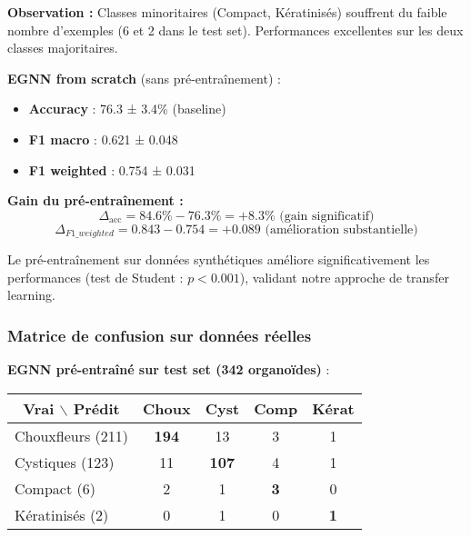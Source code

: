 \textbf{Observation :} Classes minoritaires (Compact, Kératinisés) souffrent du faible nombre d'exemples (6 et 2 dans le test set). Performances excellentes sur les deux classes majoritaires.

\textbf{EGNN from scratch} (sans pré-entraînement) :
\begin{itemize}
    \item \textbf{Accuracy} : 76.3 ± 3.4\% (baseline)
    \item \textbf{F1 macro} : 0.621 ± 0.048
    \item \textbf{F1 weighted} : 0.754 ± 0.031
\end{itemize}

\textbf{Gain du pré-entraînement :}
\[
\Delta_{\text{acc}} = 84.6\% - 76.3\% = +8.3\% \text{ (gain significatif)}
\]
\[
\Delta_{F1\_weighted} = 0.843 - 0.754 = +0.089 \text{ (amélioration substantielle)}
\]

Le pré-entraînement sur données synthétiques améliore significativement les performances (test de Student : $p < 0.001$), validant notre approche de transfer learning.

\subsubsection{Matrice de confusion sur données réelles}

\textbf{EGNN pré-entraîné sur test set (342 organoïdes)} :

\begin{center}
\begin{tabular}{|l|cccc|}
\hline
\multicolumn{1}{|c|}{\textbf{Vrai $\backslash$ Prédit}} & \textbf{Choux} & \textbf{Cyst} & \textbf{Comp} & \textbf{Kérat} \\
\hline
Chouxfleurs (211) & \textbf{194} & 13 & 3 & 1 \\
Cystiques (123) & 11 & \textbf{107} & 4 & 1 \\
Compact (6) & 2 & 1 & \textbf{3} & 0 \\
Kératinisés (2) & 0 & 1 & 0 & \textbf{1} \\
\hline
\end{tabular}
\end{center}

